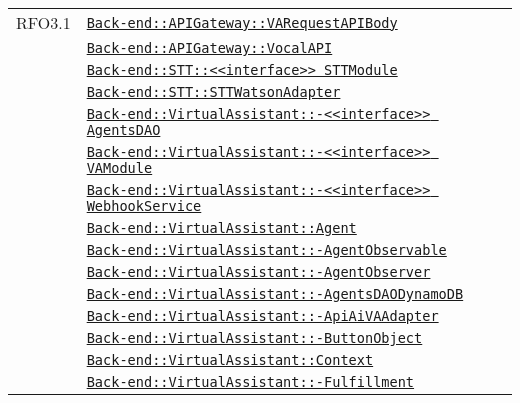 \begin{longtable}{|>{\centering}m{3cm}|m{10cm}<{\centering}|}
RFO3.1 & \hyperref[Back-end::APIGateway::VARequestAPIBody]{\texttt{Back-end::APIGateway::VARequestAPIBody}}\\
& \hyperref[Back-end::APIGateway::VocalAPI]{\texttt{Back-end::APIGateway::VocalAPI}}\\
& \hyperref[Back-end::STT::<<interface>> STTModule]{\texttt{Back-end::STT::<<interface>> STTModule}}\\
& \hyperref[Back-end::STT::STTWatsonAdapter]{\texttt{Back-end::STT::STTWatsonAdapter}}\\
& \hyperref[Back-end::VirtualAssistant::<<interface>> AgentsDAO]{\texttt{Back-end::VirtualAssistant::-\linebreak <<interface>> AgentsDAO}}\\
& \hyperref[Back-end::VirtualAssistant::<<interface>> VAModule]{\texttt{Back-end::VirtualAssistant::-\linebreak <<interface>> VAModule}}\\
& \hyperref[Back-end::VirtualAssistant::<<interface>> WebhookService]{\texttt{Back-end::VirtualAssistant::-\linebreak <<interface>> WebhookService}}\\
& \hyperref[Back-end::VirtualAssistant::Agent]{\texttt{Back-end::VirtualAssistant::Agent}}\\
& \hyperref[Back-end::VirtualAssistant::AgentObservable]{\texttt{Back-end::VirtualAssistant::-\linebreak AgentObservable}}\\
& \hyperref[Back-end::VirtualAssistant::AgentObserver]{\texttt{Back-end::VirtualAssistant::-\linebreak AgentObserver}}\\
& \hyperref[Back-end::VirtualAssistant::AgentsDAODynamoDB]{\texttt{Back-end::VirtualAssistant::-\linebreak AgentsDAODynamoDB}}\\
& \hyperref[Back-end::VirtualAssistant::ApiAiVAAdapter]{\texttt{Back-end::VirtualAssistant::-\linebreak ApiAiVAAdapter}}\\
& \hyperref[Back-end::VirtualAssistant::ButtonObject]{\texttt{Back-end::VirtualAssistant::-\linebreak ButtonObject}}\\
& \hyperref[Back-end::VirtualAssistant::Context]{\texttt{Back-end::VirtualAssistant::Context}}\\
& \hyperref[Back-end::VirtualAssistant::Fulfillment]{\texttt{Back-end::VirtualAssistant::-\linebreak Fulfillment}}\\

\end{longtable}
